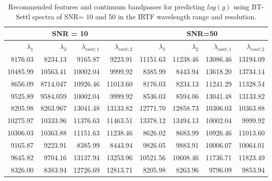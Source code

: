 \begin{table}
\begin{center}
\begin{tabular}{rrrr | rrrr}
  \hline
 \multicolumn{4}{c}{SNR = 10} &  \multicolumn{4}{c}{SNR=50} \\
  \hline
$\lambda_1$ & $\lambda_2$ & $\lambda_{cont;1}$ & $\lambda_{cont;2} $ & $\lambda_1$ & $\lambda_2$ & $\lambda_{cont;1}$ & $\lambda_{cont;2} $ \\ 
  \hline
     8176.03  & 8234.13  &	9165.87  & 9223.91  &  11151.63 & 11238.46 &      13086.46 & 13194.09 \\
     10485.99 & 10563.41 &	10002.04 & 9999.92  &  8385.99  & 8443.94  &      13618.20 & 13734.14 \\
     8656.09  & 8714.047 &      10926.46 & 11013.60 &  8176.03  & 8234.13  &      11241.29 & 11328.54 \\
     9525.89  & 9584.059 &	10002.04 & 9999.92  &  8536.03  & 8594.06  &      13041.48 & 13133.82 \\ 
     8205.98  & 8263.967 &	13041.48 & 13133.82 &  12771.70 & 12858.73 &      10306.03 & 10363.88 \\
     10275.97 & 10333.96 &	11376.63 & 11463.51 &  13378.12 & 13494.13 &      10002.04 & 9999.92  \\
     10306.03 & 10363.88 &	11151.63 & 11238.46 &  8626.02  & 8683.99  &      10926.46 & 11013.60 \\
     9165.87  & 9223.91  &	8385.99  & 8443.94  &  9826.05  & 9883.91  &      10006.07 & 10064.01 \\
     9645.82  & 9704.16  &	13137.94 & 13253.96 &  10521.56 & 10608.46 &      11736.71 & 11823.49 \\
     8326.00  & 8383.94  &	12726.69 & 12813.71 &  8205.98  & 8263.96  &      9796.09  & 9853.94  \\ 
   \hline
\end{tabular}
\caption {Recommended features and continuum bandpasses for predicting
  $log(g)$ using BT-Settl spectra of SNR= $10$ and 50 in the IRTF
  wavelength range and resolution.} \label{tab:irtf-logg-noisy}
\end{center}
\end{table}

